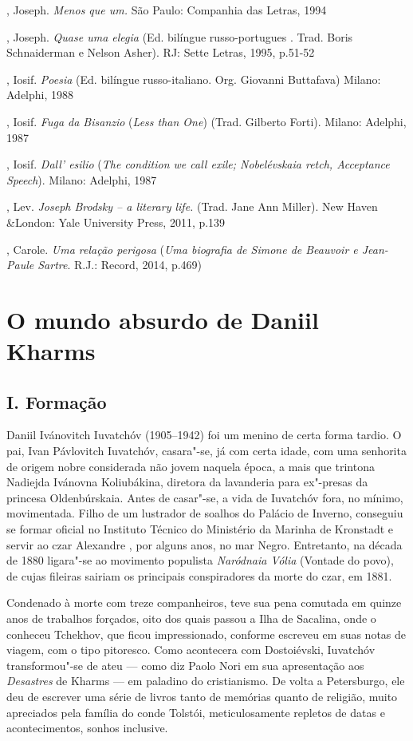 , Joseph. \emph{Menos que um.} São Paulo: Companhia das Letras,
1994

, Joseph. \emph{Quase uma elegia} (Ed. bilíngue russo-portugues
. Trad. Boris Schnaiderman e Nelson Asher). RJ: Sette Letras, 1995,
p.51-52

, Iosif. \emph{Poesia} (Ed. bilíngue russo-italiano. Org.
Giovanni Buttafava) Milano: Adelphi, 1988

, Iosif. \emph{Fuga da Bisanzio} (\emph{Less than One}) (Trad.
Gilberto Forti). Milano: Adelphi, 1987

, Iosif. \emph{Dall' esilio} (\emph{The condition we call exile;
Nobelévskaia retch, Acceptance Speech}). Milano: Adelphi, 1987

, Lev. \emph{Joseph Brodsky -- a literary life.} (Trad. Jane Ann
Miller). New Haven \&London: Yale University Press, 2011, p.139

, Carole. \emph{Uma relação perigosa} (\emph{Uma biografia
de Simone de Beauvoir e Jean-Paule Sartre}. R.J.: Record, 2014, p.469)

\chapter{O mundo absurdo de Daniil Kharms}

\section{I. Formação}

Daniil Ivánovitch Iuvatchóv (1905--1942) foi um menino de certa forma
tardio. O pai, Ivan Pávlovitch Iuvatchóv, casara"-se, já com certa idade,
com uma senhorita de origem nobre considerada não jovem naquela época, a
mais que trintona Nadiejda Ivánovna Koliubákina, diretora da lavanderia
para ex"-presas da princesa Oldenbúrskaia. Antes de casar"-se, a vida de
Iuvatchóv fora, no mínimo, movimentada. Filho de um lustrador de soalhos
do Palácio de Inverno, conseguiu se formar oficial no Instituto Técnico
do Ministério da Marinha de Kronstadt e servir ao czar Alexandre ,
por alguns anos, no mar Negro. Entretanto, na década de 1880 ligara"-se
ao movimento populista \emph{Naródnaia Vólia} (Vontade do povo), de
cujas fileiras sairiam os principais conspiradores da morte do czar, em
1881.

Condenado à morte com treze companheiros, teve sua pena comutada em
quinze anos de trabalhos forçados, oito dos quais passou a Ilha de
Sacalina, onde o conheceu Tchekhov, que ficou impressionado, conforme
escreveu em suas notas de viagem, com o tipo pitoresco. Como acontecera
com Dostoiévski, Iuvatchóv transformou"-se de ateu --- como diz Paolo Nori
em sua apresentação aos \emph{Desastres} de Kharms --- em paladino do
cristianismo. De volta a Petersburgo, ele deu de escrever uma série de
livros tanto de memórias quanto de religião, muito apreciados pela
família do conde Tolstói, meticulosamente repletos de datas e
acontecimentos, sonhos inclusive.

